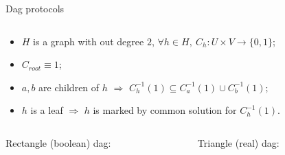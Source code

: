 \begin{frame}{Dag protocols}
    \vspace{-0.8cm}
    \begin{columns}[t]
        \begin{column}{0.58\textwidth}
            \begin{itemize}
                \item $H$ is a graph with out degree $2$, $\forall h \in H, ~ C_h: U \times V \to \{0,
                    1\}$;
                \item $C_{root} \equiv 1$;
                \item $a, b$ are children of $h$ $\Rightarrow$ $C_{h}^{-1}(1) \subseteq C_{a}^{-1}(1)
                    \cup C_{b}^{-1}(1)$;
                \item $h$ is a leaf $\Rightarrow$ $h$ is marked by common solution for $C_h^{-1}(1)$.
            \end{itemize}
        \end{column}

		\begin{column}{0.38\textwidth}
            \begin{center}
                
            \end{center}
		\end{column}
	\end{columns}

    \pause
    \begin{columns}[t]
		\begin{column}{0.48\textwidth}
            \begin{center}
                Rectangle (boolean) dag:
                \vspace{0.2cm}
                
            \end{center}
        \end{column}

		\begin{column}{0.48\textwidth}
            \begin{center}
                Triangle (real) dag:
                \vspace{0.2cm}
                
            \end{center}
		\end{column}
	\end{columns}
\end{frame}


